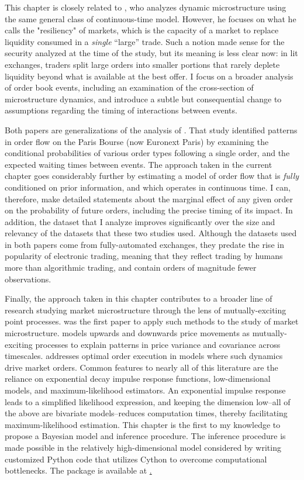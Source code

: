 This chapter is closely related to \cite{Large2007}, who analyzes dynamic microstructure using the same general class of continuous-time model. However, he focuses on what he calls the "resiliency" of markets, which is the capacity of a market to replace liquidity consumed in a \textit{single} ``large'' trade. Such a notion made sense for the security analyzed at the time of the study, but its meaning is less clear now: in lit exchanges, traders split large orders into smaller portions that rarely deplete liquidity beyond what is available at the best offer. I focus on a broader analysis of order book events, including an examination of the cross-section of microstructure dynamics, and introduce a subtle but consequential change to assumptions regarding the timing of interactions between events.

Both papers are generalizations of the analysis of \cite{Biais1995}. That study identified patterns in order flow on the Paris Bourse (now Euronext Paris) by examining the conditional probabilities of various order types following a single order, and the expected waiting times between events. The approach taken in the current chapter goes considerably further by estimating a model of order flow that is \textit{fully} conditioned on prior information, and which operates in continuous time. I can, therefore, make detailed statements about the marginal effect of any given order on the probability of future orders, including the precise timing of its impact. In addition, the dataset that I analyze improves significantly over the size and relevancy of the datasets that these two studies used. Although the datasets used in both papers come from fully-automated exchanges, they predate the rise in popularity of electronic trading, meaning that they reflect trading by humans more than algorithmic trading, and contain orders of magnitude fewer observations.

Finally, the approach taken in this chapter contributes to a broader line of research studying market microstructure through the lens of mutually-exciting point processes. \cite{Bowsher2007} was the first paper to apply such methods to the study of market microstructure. \cite{Bacry2013} models upwards and downwards price movements as mutually-exciting processes to explain patterns in price variance and covariance across timescales. \cite{Alfonsi2016} addresses optimal order execution in models where such dynamics drive market orders. Common features to nearly all of this literature are the reliance on exponential decay impulse response functions, low-dimensional models, and maximum-likelihood estimators. An exponential impulse response leads to a simplified likelihood expression, and keeping the dimension low--all of the above are bivariate models--reduces computation times, thereby facilitating maximum-likelihood estimation. This chapter is the first to my knowledge to propose a Bayesian model and inference procedure. The inference procedure is made possible in the relatively high-dimensional model considered by writing customized Python code that utilizes Cython to overcome computational bottlenecks. The package is available at \href{https://github.com/cswaney/fawkes}.


